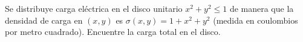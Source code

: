 \item Se distribuye carga eléctrica en el disco unitario $x^2 + y^2 \le 1$ de manera que la densidad de carga en $(x, y)$ es $\sigma(x, y) = 1 + x^2 + y^2$ (medida en coulombios por metro cuadrado). Encuentre la carga total en el disco.
